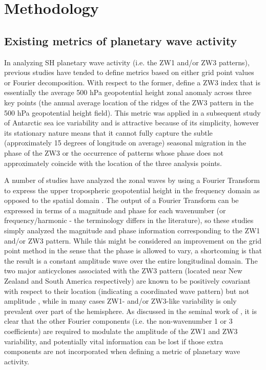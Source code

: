 \section{Methodology}\label{s:methodology}

\subsection{Existing metrics of planetary wave activity}\label{s:existing_metrics}

In analyzing SH planetary wave activity (i.e. the ZW1 and/or ZW3 patterns), previous studies have tended to define metrics based on either grid point values or Fourier decomposition. With respect to the former, \citet{Raphael2004} define a ZW3 index that is essentially the average 500 hPa geopotential height zonal anomaly across three key points (the annual average location of the ridges of the ZW3 pattern in the 500 hPa geopotential height field). This metric was applied in a subsequent study of Antarctic sea ice variability \citep{Raphael2007} and is attractive because of its simplicity, however its stationary nature means that it cannot fully capture the subtle (approximately 15 degrees of longitude on average) seasonal migration in the phase of the ZW3 \citep{vanLoon1984,Mo1985} or the occurrence of patterns whose phase does not approximately coincide with the location of the three analysis points.

A number of studies have analyzed the zonal waves by using a Fourier Transform to express the upper tropospheric geopotential height in the frequency domain as opposed to the spatial domain \citep{Hobbs2007,Hobbs2010,Turner2013}. The output of a Fourier Transform can be expressed in terms of a magnitude and phase for each wavenumber (or frequency/harmonic - the terminology differs in the literature), so these studies simply analyzed the magnitude and phase information corresponding to the ZW1 and/or ZW3 pattern. While this might be considered an improvement on the grid point method in the sense that the phase is allowed to vary, a shortcoming is that the result is a constant amplitude wave over the entire longitudinal domain. The two major anticyclones associated with the ZW3 pattern (located near New Zealand and South America respectively) are known to be positively covariant with respect to their location (indicating a coordinated wave pattern) but not amplitude \citep{Hobbs2010}, while in many cases ZW1- and/or ZW3-like variability is only prevalent over part of the hemisphere. As discussed in the seminal work of \citet{vanLoon1972}, it is clear that the other Fourier components (i.e. the non-wavenumber 1 or 3 coefficients) are required to modulate the amplitude of the ZW1 and ZW3 variability, and potentially vital information can be lost if those extra components are not incorporated when defining a metric of planetary wave activity. 


